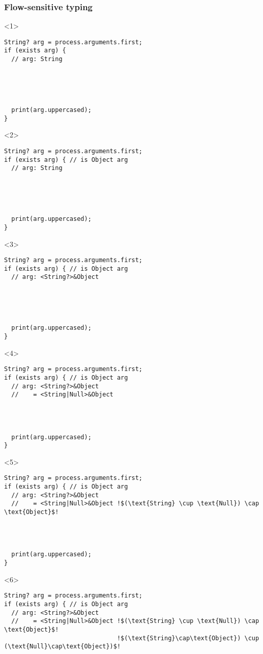 \documentclass[aspectratio=169]{beamer}
\begin{document}
\begin{frame}[fragile]
  \frametitle{Flow-sensitive typing}
  \begin{onlyenv}<1>
    \begin{lstlisting}
String? arg = process.arguments.first;
if (exists arg) {
  // arg: String





  print(arg.uppercased);
}
    \end{lstlisting}
  \end{onlyenv}
  \begin{onlyenv}<2>
    \begin{lstlisting}
String? arg = process.arguments.first;
if (exists arg) { // is Object arg
  // arg: String





  print(arg.uppercased);
}
    \end{lstlisting}
  \end{onlyenv}
  \begin{onlyenv}<3>
    \begin{lstlisting}
String? arg = process.arguments.first;
if (exists arg) { // is Object arg
  // arg: <String?>&Object





  print(arg.uppercased);
}
    \end{lstlisting}
  \end{onlyenv}
  \begin{onlyenv}<4>
    \begin{lstlisting}
String? arg = process.arguments.first;
if (exists arg) { // is Object arg
  // arg: <String?>&Object
  //    = <String|Null>&Object




  print(arg.uppercased);
}
    \end{lstlisting}
  \end{onlyenv}
  \begin{onlyenv}<5>
    \begin{lstlisting}[escapechar=!]
String? arg = process.arguments.first;
if (exists arg) { // is Object arg
  // arg: <String?>&Object
  //    = <String|Null>&Object !$(\text{String} \cup \text{Null}) \cap \text{Object}$!




  print(arg.uppercased);
}
    \end{lstlisting}
  \end{onlyenv}
  \begin{onlyenv}<6>
    \begin{lstlisting}[escapechar=!]
String? arg = process.arguments.first;
if (exists arg) { // is Object arg
  // arg: <String?>&Object
  //    = <String|Null>&Object !$(\text{String} \cup \text{Null}) \cap \text{Object}$!
                               !$(\text{String}\cap\text{Object}) \cup (\text{Null}\cap\text{Object})$!




\end{lstlisting}
\end{onlyenv}
\end{frame}
\end{document}
